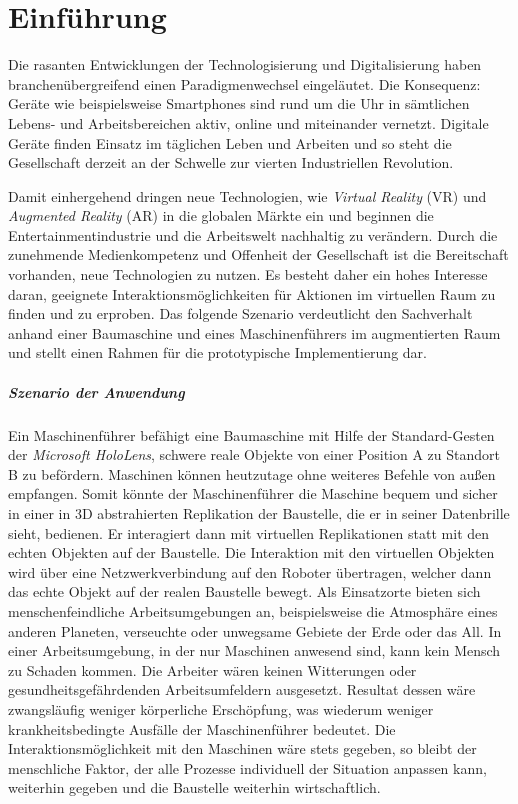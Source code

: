 \chapter{Einführung}
Die rasanten Entwicklungen der Technologisierung und Digitalisierung haben branchenübergreifend einen Paradigmenwechsel eingeläutet. Die Konsequenz: Geräte wie beispielsweise Smartphones sind rund um die Uhr in sämtlichen Lebens- und Arbeitsbereichen aktiv, online und miteinander vernetzt. Digitale Geräte finden Einsatz im täglichen Leben und Arbeiten und so steht die Gesellschaft derzeit an der Schwelle zur vierten Industriellen Revolution.

Damit einhergehend dringen neue Technologien, wie \textit{Virtual Reality} (VR) und \textit{Augmented Reality} (AR) in die globalen Märkte ein und beginnen die Entertainmentindustrie und die Arbeitswelt nachhaltig zu verändern. Durch die zunehmende Medienkompetenz und Offenheit der Gesellschaft ist die Bereitschaft vorhanden, neue Technologien zu nutzen. Es besteht daher ein hohes Interesse daran, geeignete Interaktionsmöglichkeiten für Aktionen im virtuellen Raum zu finden und zu erproben.
Das folgende Szenario verdeutlicht den Sachverhalt anhand einer Baumaschine und eines Maschinenführers im augmentierten Raum und stellt einen Rahmen für die prototypische Implementierung dar.
\paragraph*{Szenario der Anwendung}
Ein Maschinenführer befähigt eine Baumaschine mit Hilfe der Standard-Gesten der \textit{Microsoft HoloLens}, schwere reale Objekte von einer Position A zu Standort B zu befördern. Maschinen können heutzutage ohne weiteres Befehle von außen empfangen. Somit könnte der Maschinenführer die Maschine bequem und sicher in einer in 3D abstrahierten Replikation der Baustelle, die er in seiner Datenbrille sieht, bedienen. Er interagiert dann mit virtuellen Replikationen statt mit den echten Objekten auf der Baustelle. Die Interaktion mit den virtuellen Objekten wird über eine Netzwerkverbindung auf den Roboter übertragen, welcher dann das echte Objekt auf der realen Baustelle bewegt. Als Einsatzorte bieten sich menschenfeindliche Arbeitsumgebungen an, beispielsweise die Atmosphäre eines anderen Planeten, verseuchte oder unwegsame Gebiete der Erde oder das All.
In einer Arbeitsumgebung, in der nur Maschinen anwesend sind, kann kein Mensch zu Schaden kommen. Die Arbeiter wären keinen Witterungen oder gesundheitsgefährdenden Arbeitsumfeldern ausgesetzt. Resultat dessen wäre zwangsläufig weniger körperliche Erschöpfung, was wiederum weniger krankheitsbedingte Ausfälle der Maschinenführer bedeutet.
Die Interaktionsmöglichkeit mit den Maschinen wäre stets gegeben, so bleibt der menschliche Faktor, der alle Prozesse individuell der Situation anpassen kann, weiterhin gegeben und die Baustelle weiterhin wirtschaftlich.
